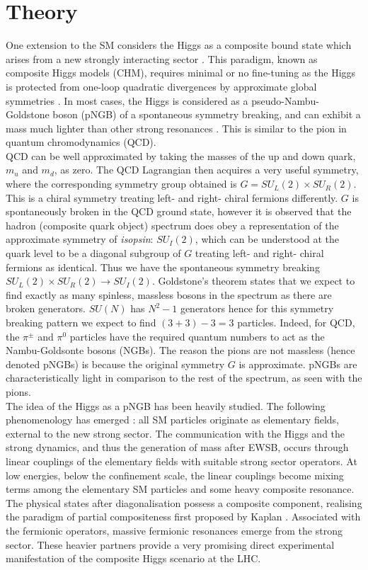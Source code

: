 \documentclass[a4paper]{jpconf}
\begin{document}
\section{Theory}
One extension to the SM considers the Higgs as a composite bound state which arises from a new strongly interacting sector \cite{kaplan}. This paradigm, known as composite Higgs models (CHM), requires minimal or no fine-tuning as the Higgs is protected from one-loop quadratic divergences by approximate global symmetries \cite{lhr}. In most cases, the Higgs is considered as a pseudo-Nambu-Goldstone boson (pNGB) of a spontaneous symmetry breaking, and can exhibit a mass much lighter than other strong resonances \cite{contino}. This is similar to the pion in quantum chromodynamics (QCD)\cite{burgess}. \\
\hfill\break
QCD can be well approximated by taking the masses of the up and down quark, \(m_u\) and \(m_d\), as zero. The QCD Lagrangian then acquires a very useful symmetry, where the corresponding symmetry group obtained is \(G = SU_L(2) \times SU_R(2)\). This is a chiral symmetry treating left- and right- chiral fermions differently. \(G\) is spontaneously broken in the QCD ground state, however it is observed that the hadron (composite quark object) spectrum does obey a representation of the approximate symmetry of \emph{isopsin}: \(SU_I(2)\), which can be understood at the quark level to be a diagonal subgroup of \(G\) treating left- and right- chiral fermions as identical. Thus we have the spontaneous symmetry breaking \(SU_L(2) \times SU_R(2) \to SU_I(2)\). Goldstone's theorem \cite{goldstone} states that we expect to find exactly as many spinless, massless bosons in the spectrum as there are broken generators. \(SU(N)\) has \(N^2-1\) generators hence for this symmetry breaking pattern we expect to find \((3+3) - 3 = 3\) particles. Indeed, for QCD, the \(\pi^{\pm}\) and \(\pi^0\) particles have the required quantum numbers to act as the Nambu-Goldsonte bosons (NGBs). The reason the pions are not massless (hence denoted pNGBs) is because the original symmetry \(G\) is approximate. pNGBs are characteristically light in comparison to the rest of the spectrum, as seen with the pions. \\
\hfill\break
The idea of the Higgs as a pNGB has been heavily studied. The following phenomenology has emerged \cite{ltlh}: all SM particles originate as elementary fields, external to the new strong sector. The communication with the Higgs and the strong dynamics, and thus the generation of mass after EWSB, occurs through linear couplings of the elementary fields with suitable strong sector operators. At low energies, below the confinement scale, the linear couplings become mixing terms among the elementary SM particles and some heavy composite resonance. The physical states after diagonalisation possess a composite component, realising the paradigm of partial compositeness first proposed by Kaplan \cite{kaplan1}. Associated with the fermionic operators, massive fermionic resonances emerge from the strong sector. These heavier partners provide a very promising direct experimental manifestation of the composite Higgs scenario at the LHC. \\
\end{document}
